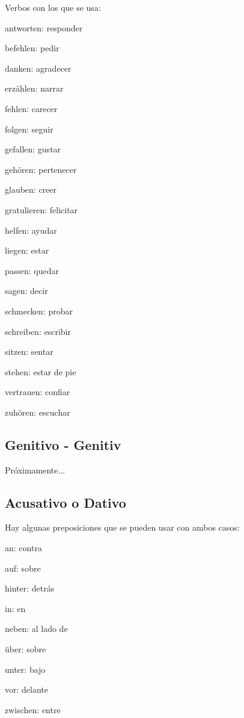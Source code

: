 Verbos con los que se usa:
\begin{multicols}{3}
\begin{myitemize}
\item antworten: responder
\item befehlen: pedir
\item danken: agradecer
\item erzählen: narrar
\item fehlen: carecer
\item folgen: seguir
\item gefallen: gustar
\item gehören: pertenecer
\item glauben: creer
\item gratulieren: felicitar
\item helfen: ayudar
\item liegen: estar
\item passen: quedar
\item sagen: decir
\item schmecken: probar
\item schreiben: escribir
\item sitzen: sentar
\item stehen: estar de pie
\item vertrauen: confiar
\item zuhören: escuchar
\end{myitemize}
\end{multicols}

\subsection{Genitivo - Genitiv}
Próximamente...

\subsection{Acusativo o Dativo}
Hay algunas preposiciones que se pueden usar con ambos casos:
\begin{multicols}{3}
\begin{myitemize}
\item an: contra
\item auf: sobre
\item hinter: detrás
\item in: en
\item neben: al lado de
\item über: sobre
\item unter: bajo
\item vor: delante
\item zwischen: entre
\end{myitemize}
\end{multicols}

